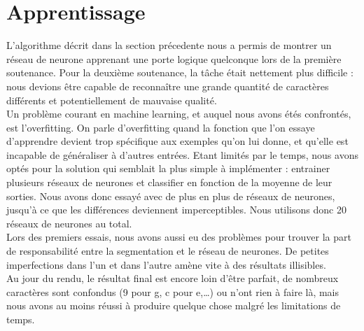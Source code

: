 \section{Apprentissage}
L'algorithme décrit dans la section précedente nous a permis de montrer un réseau de neurone apprenant une porte logique quelconque lors de la première soutenance. Pour la deuxième soutenance, la tâche était nettement plus difficile : nous devions être capable de reconnaître une grande quantité de caractères différents et potentiellement de mauvaise qualité.\\
Un problème courant en machine learning, et auquel nous avons étés confrontés, est l'overfitting. On parle d'overfitting quand la fonction que l'on essaye d'apprendre devient trop spécifique aux exemples qu'on lui donne, et qu'elle est incapable de généraliser à d'autres entrées. Etant limités par le temps, nous avons optés pour la solution qui semblait la plus simple à implémenter : entrainer plusieurs réseaux de neurones et classifier en fonction de la moyenne de leur sorties. Nous avons donc essayé avec de plus en plus de réseaux de neurones, jusqu'à ce que les différences deviennent imperceptibles. Nous utilisons donc 20 réseaux de neurones au total.\\
Lors des premiers essais, nous avons aussi eu des problèmes pour trouver la part de responsabilité entre la segmentation et le réseau de neurones. De petites imperfections dans l'un et dans l'autre amène vite à des résultats illisibles.\\
Au jour du rendu, le résultat final est encore loin d'être parfait, de nombreux caractères sont confondus (9 pour g, c pour e,\ldots ) ou n'ont rien à faire là, mais nous avons au moins réussi à produire quelque chose malgré les limitations de temps.
